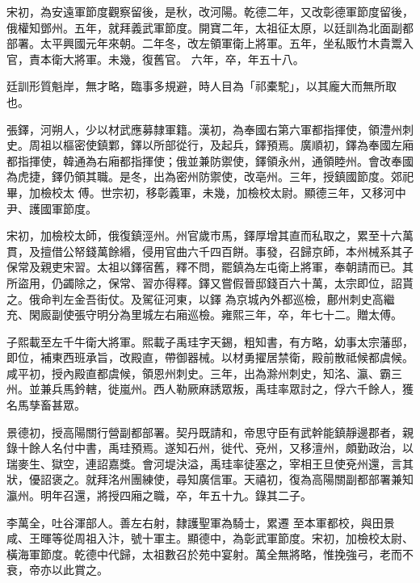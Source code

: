 \begin{pinyinscope}
 宋初，為安遠軍節度觀察留後，是秋，改河陽。乾德二年，又改彰德軍節度留後，俄權知鄧州。五年，就拜義武軍節度。開寶二年，太祖征太原，以廷訓為北面副都部署。太平興國元年來朝。二年冬，改左領軍衛上將軍。五年，坐私販竹木貴鬻入官，責本衛大將軍。未幾，復舊官。
 六年，卒，年五十八。



 廷訓形質魁岸，無才略，臨事多規避，時人目為「祁橐駝」，以其龐大而無所取也。



 張鐸，河朔人，少以材武應募隸軍籍。漢初，為奉國右第六軍都指揮使，領澧州刺史。周祖以樞密使鎮鄴，鐸以所部從行，及起兵，鐸預焉。廣順初，鐸為奉國左廂都指揮使，韓通為右廂都指揮使；俄並兼防禦使，鐸領永州，通領睦州。會改奉國為虎捷，鐸仍領其職。是冬，出為密州防禦使，改亳州。三年，授鎮國節度。郊祀畢，加檢校太
 傅。世宗初，移彰義軍，未幾，加檢校太尉。顯德三年，又移河中尹、護國軍節度。



 宋初，加檢校太師，俄復鎮涇州。州官歲市馬，鐸厚增其直而私取之，累至十六萬貫，及擅借公帑錢萬餘緡，侵用官曲六千四百餅。事發，召歸京師，本州械系其子保常及親吏宋習。太祖以鐸宿舊，釋不問，罷鎮為左屯衛上將軍，奉朝請而已。其所盜用，仍蠲除之，保常、習亦得釋。鐸又嘗假晉邸錢百六十萬，太宗即位，詔貰之。俄命判左金吾街仗。及駕征河東，以鐸
 為京城內外都巡檢，鄜州刺史高繼充、閑廄副使張守明分為里城左右廂巡檢。雍熙三年，卒，年七十二。贈太傅。



 子熙載至左千牛衛大將軍。熙載子禹珪字天錫，粗知書，有方略，幼事太宗藩邸，即位，補東西班承旨，改殿直，帶御器械。以材勇擢居禁衛，殿前散祗候都虞候。咸平初，授內殿直都虞候，領恩州刺史。三年，出為滁州刺史，知洺、瀛、霸三州。並兼兵馬鈐轄，徙嵐州。西人勒厥麻誘眾叛，禹珪率眾討之，俘六千餘人，獲名馬孳畜甚眾。



 景德初，授高陽關行營副都部署。契丹既請和，帝思守臣有武幹能鎮靜邊郡者，親錄十餘人名付中書，禹珪預焉。遂知石州，徙代、兗州，又移澶州，頗勤政治，以瑞麥生、獄空，連詔嘉獎。會河堤決溢，禹珪率徒塞之，宰相王旦使兗州還，言其狀，優詔褒之。就拜洺州團練使，尋知廣信軍。天禧初，復為高陽關副都部署兼知瀛州。明年召還，將授四廂之職，卒，年五十九。錄其二子。



 李萬全，吐谷渾部人。善左右射，隸護聖軍為騎士，累遷
 至本軍都校，與田景咸、王暉等從周祖入汴，號十軍主。顯德中，為彰武軍節度。宋初，加檢校太尉、橫海軍節度。乾德中代歸，太祖數召於苑中宴射。萬全無將略，惟挽強弓，老而不衰，帝亦以此賞之。




\end{pinyinscope}
